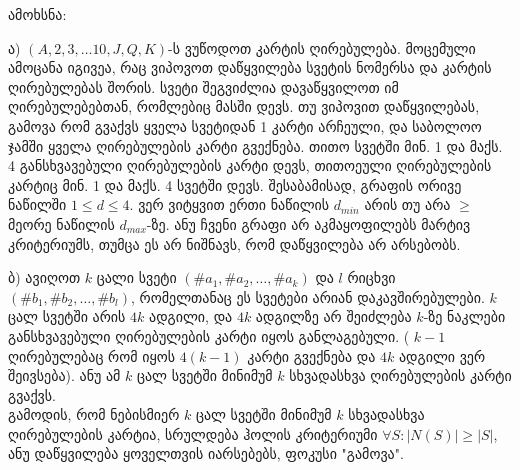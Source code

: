\documentclass[a4paper, 11pt]{article}
\begin{document}
\begin{sloppypar}
{
ამოხსნა:
}

ა) $(A, 2, 3,\dots 10, J, Q, K)$-ს ვუწოდოთ კარტის ღირებულება. მოცემული ამოცანა იგივეა, რაც ვიპოვოთ დაწყვილება სვეტის ნომერსა და კარტის ღირებულებას შორის. სვეტი შეგვიძლია დავაწყვილოთ იმ ღირებულებებთან, რომლებიც მასში დევს. თუ ვიპოვით დაწყვილებას, გამოვა რომ გვაქვს ყველა სვეტიდან 1 კარტი არჩეული, და საბოლოო ჯამში ყველა ღირებულების კარტი გვექნება.
თითო სვეტში მინ. 1 და მაქს. 4 განსხვავებული ღირებულების კარტი დევს, თითოეული ღირებულების კარტიც მინ. 1 და მაქს. 4 სვეტში დევს. შესაბამისად, გრაფის ორივე ნაწილში $1 \leq d \leq 4$. ვერ ვიტყვით ერთი ნაწილის $d_{min}$ არის თუ არა $\geq$ მეორე ნაწილის $d_{max}$-ზე. ანუ ჩვენი გრაფი არ აკმაყოფილებს მარტივ კრიტერიუმს, თუმცა ეს არ ნიშნავს, რომ დაწყვილება არ არსებობს.

ბ) ავიღოთ $k$ ცალი სვეტი $(\#a_1,\#a_2, \dots, \#a_k)$ და $l$ რიცხვი $(\#b_1,\#b_2, \dots, \#b_l)$, რომელთანაც ეს სვეტები არიან დაკავშირებულები. $k$ ცალ სვეტში არის $4k$ ადგილი, და $4k$ ადგილზე არ შეიძლება $k$-ზე ნაკლები განსხვავებული ღირებულების კარტი იყოს განლაგებული. ( $k - 1$ ღირებულებაც რომ იყოს $4(k - 1)$ კარტი გვექნება და $4k$ ადგილი ვერ შეივსება). ანუ ამ $k$ ცალ სვეტში მინიმუმ $k$ სხვადასხვა ღირებულების კარტი გვაქვს.
\\გამოდის, რომ ნებისმიერ $k$ ცალ სვეტში მინიმუმ $k$ სხვადასხვა ღირებულების კარტია, სრულდება ჰოლის კრიტერიუმი $\forall S : |N(S)| \geq |S|$, ანუ დაწყვილება ყოველთვის იარსებებს, ფოკუსი "გამოვა".


\end{sloppypar}
\end{document}
